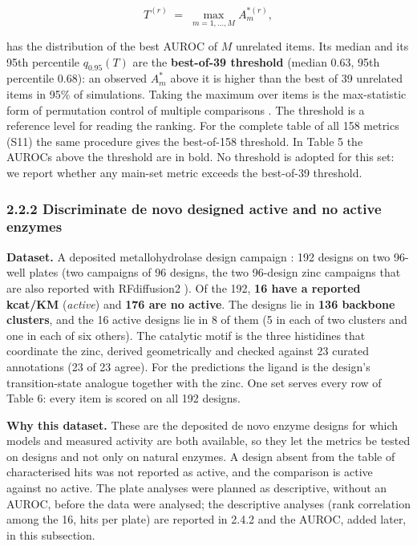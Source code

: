 \documentclass[
  10pt,
]{article}
\DeclareRobustCommand{\_}{\textunderscore\hspace{0pt}}
\begin{document}
\begin{equation*}T^{(r)} \;=\; \max_{m = 1,\dots,M} A^{*(r)}_{m}, \tag{4}\end{equation*}

has the distribution
of the best AUROC of
\(M\) unrelated
items. Its median
and its 95th
percentile
\(q_{0.95}(T)\) are
the
\textbf{best-of-39
threshold} (median
0.63, 95th
percentile 0.68): an
observed \(A^{*}_m\)
above it is higher
than the best of 39
unrelated items in
95\% of simulations.
Taking the maximum
over items is the
max-statistic form
of permutation
control of multiple
comparisons
\cite{westfall1993}.
The threshold is a
reference level for
reading the ranking.
For the complete
table of all 158
metrics (S11) the
same procedure gives
the best-of-158
threshold. In Table
5 the AUROCs above
the threshold are in
bold. No threshold
is adopted for this
set: we report
whether any main-set
metric exceeds the
best-of-39
threshold.

\subsubsection{2.2.2
Discriminate de novo
designed active and
no active enzymes}

\textbf{Dataset.} A
deposited
metallohydrolase
design campaign
\cite{kim2026}: 192
designs on two
96-well plates (two
campaigns of 96
designs, the two
96-design zinc
campaigns that are
also reported with
RFdiffusion2
\cite{ahern2026}).
Of the 192,
\textbf{16 have a
reported kcat/KM}
(\emph{active}) and
\textbf{176 are no
active}. The designs
lie in \textbf{136
backbone clusters},
and the 16 active
designs lie in 8 of
them (5 in each of
two clusters and one
in each of six
others). The
catalytic motif is
the three histidines
that coordinate the
zinc, derived
geometrically and
checked against 23
curated annotations
(23 of 23 agree).
For the predictions
the ligand is the
design's
transition-state
analogue together
with the zinc. One
set serves every row
of Table 6: every
item is scored on
all 192 designs.

\textbf{Why this
dataset.} These are
the deposited de
novo enzyme designs
for which models and
measured activity
are both available,
so they let the
metrics be tested on
designs and not only
on natural enzymes.
A design absent from
the table of
characterised hits
was not reported as
active, and the
comparison is active
against no active.
The plate analyses
were planned as
descriptive, without
an AUROC, before the
data were analysed;
the descriptive
analyses (rank
correlation among
the 16, hits per
plate) are reported
in 2.4.2 and the
AUROC, added later,
in this subsection.
\end{document}
